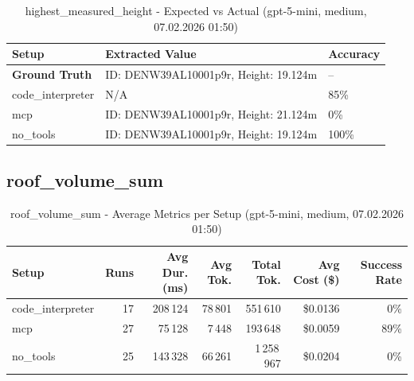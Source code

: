 \documentclass[a4paper,11pt]{article}
\begin{document}
\begin{table}[H]
\centering
\scriptsize
\caption{highest\_measured\_height - Expected vs Actual (gpt-5-mini, medium, 07.02.2026 01:50)}
\begin{tabular}{l l l}
\toprule
Setup & Extracted Value & Accuracy \\
\midrule
\textbf{Ground Truth} & ID: DENW39AL10001p9r, Height: 19.124m & -- \\
\midrule
code\_interpreter & N/A & 85\% \\
mcp & ID: DENW39AL10001p9r, Height: 21.124m & 0\% \\
no\_tools & ID: DENW39AL10001p9r, Height: 19.124m & 100\% \\
\bottomrule
\end{tabular}
\end{table}

\clearpage

\subsection{roof\_volume\_sum}

\begin{table}[H]
\centering
\scriptsize
\caption{roof\_volume\_sum - Average Metrics per Setup (gpt-5-mini, medium, 07.02.2026 01:50)}
\label{tab:combined\_roof\_volume\_sum\_metrics\_20260207}
\begin{tabular}{l r r r r r r}
\toprule
Setup & Runs & Avg Dur. (ms) & Avg Tok. & Total Tok. & Avg Cost (\$) & Success Rate \\
\midrule
code\_interpreter & 17 & 208\,124 & 78\,801 & 551\,610 & \$0.0136 & 0\% \\
mcp & 27 & 75\,128 & 7\,448 & 193\,648 & \$0.0059 & 89\% \\
no\_tools & 25 & 143\,328 & 66\,261 & 1\,258\,967 & \$0.0204 & 0\% \\
\bottomrule
\end{tabular}
\end{table}
\end{document}
